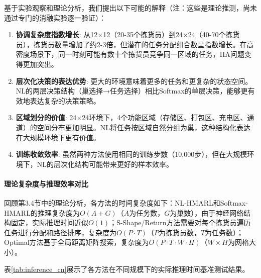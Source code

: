 \documentclass[12pt,a4paper]{article}
\begin{document}
基于实验观察和理论分析，我们提出以下可能的解释（注：这些是理论推测，尚未通过专门的消融实验逐一验证）：

\begin{enumerate}
\item \textbf{协调复杂度指数增长}: 从12$\times$12（20-35个拣货员）到24$\times$24（40-70个拣货员），拣货员数量增加了约2-3倍，但潜在的任务分配组合数呈指数增长。在高密度场景下，同一时刻可能有数十个拣货员竞争同一区域的任务，IIA问题变得更加突出。

\item \textbf{层次化决策的表达优势}: 更大的环境意味着更多的任务和更复杂的状态空间。NL的两层决策结构（巢选择→任务选择）相比Softmax的单层决策，能够更有效地表达复杂的决策策略。

\item \textbf{区域划分的价值}: 24$\times$24环境下，4个功能区域（存储区、打包区、充电区、通道）的空间分布更加明显。NL将任务按区域自然分组为巢，这种结构化表达在大规模环境下更有价值。

\item \textbf{训练收敛效率}: 虽然两种方法使用相同的训练步数（10,000步），但在大规模环境下，NL的层次化结构可能带来更好的样本效率。
\end{enumerate}

\paragraph{理论复杂度与推理效率对比}

回顾第3.4节中的理论分析，各方法的时间复杂度如下：NL-HMARL和Softmax-HMARL的推理复杂度为$O(A+G)$（$A$为任务数，$G$为巢数），由于神经网络结构固定，实际推理时间近似$O(1)$；S-Shape/Return方法需要对每个拣货员遍历任务进行分配和路径排序，复杂度为$O(P \cdot T)$（$P$为拣货员数，$T$为任务数）；Optimal方法基于全局距离矩阵搜索，复杂度为$O(P \cdot T \cdot W \cdot H)$（$W \times H$为网格大小）。

表\ref{tab:inference_cn}展示了各方法在不同规模下的实际推理时间基准测试结果。

\begin{table}[ht]
\centering
\caption{各方法推理效率对比}
\label{tab:inference_cn}
\end{table}
\end{document}
